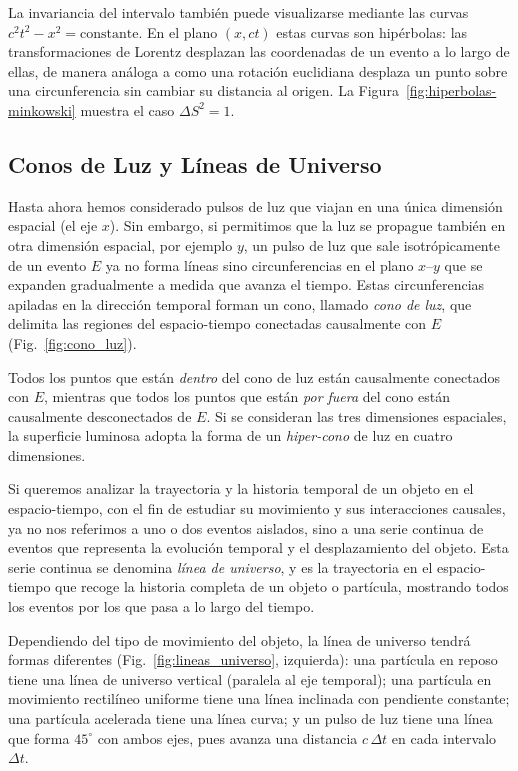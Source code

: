 La invariancia del intervalo también puede visualizarse mediante las curvas $c^2t^2-x^2=\text{constante}$. En el plano $(x,ct)$ estas curvas son hipérbolas: las transformaciones de Lorentz desplazan las coordenadas de un evento a lo largo de ellas, de manera análoga a como una rotación euclidiana desplaza un punto sobre una circunferencia sin cambiar su distancia al origen. La Figura~\ref{fig:hiperbolas-minkowski} muestra el caso $\Delta S^2=1$.



\subsection{Conos de Luz y Líneas de Universo}

Hasta ahora hemos considerado pulsos de luz que viajan en una única dimensión espacial (el eje $x$). Sin embargo, si permitimos que la luz se propague también en otra dimensión espacial, por ejemplo $y$, un pulso de luz que sale isotrópicamente de un evento $E$ ya no forma líneas sino circunferencias en el plano $x$–$y$ que se expanden gradualmente a medida que avanza el tiempo. Estas circunferencias apiladas en la dirección temporal forman un cono, llamado \emph{cono de luz}, que delimita las regiones del espacio-tiempo conectadas causalmente con $E$ (Fig.~\ref{fig:cono_luz}).

Todos los puntos que están \emph{dentro} del cono de luz están causalmente conectados con $E$, mientras que todos los puntos que están \emph{por fuera} del cono están causalmente desconectados de $E$. Si se consideran las tres dimensiones espaciales, la superficie luminosa adopta la forma de un \emph{hiper-cono} de luz en cuatro dimensiones.



Si queremos analizar la trayectoria y la historia temporal de un objeto en el espacio-tiempo, con el fin de estudiar su movimiento y sus interacciones causales, ya no nos referimos a uno o dos eventos aislados, sino a una serie continua de eventos que representa la evolución temporal y el desplazamiento del objeto. Esta serie continua se denomina \emph{línea de universo}, y es la trayectoria en el espacio-tiempo que recoge la historia completa de un objeto o partícula, mostrando todos los eventos por los que pasa a lo largo del tiempo.

Dependiendo del tipo de movimiento del objeto, la línea de universo tendrá formas diferentes (Fig.~\ref{fig:lineas_universo}, izquierda): una partícula en reposo tiene una línea de universo vertical (paralela al eje temporal); una partícula en movimiento rectilíneo uniforme tiene una línea inclinada con pendiente constante; una partícula acelerada tiene una línea curva; y un pulso de luz tiene una línea que forma $45^\circ$ con ambos ejes, pues avanza una distancia $c\,\Delta t$ en cada intervalo $\Delta t$.


